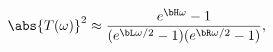 \begin{equation} \label{stringy-transmission}
\abs{T(\omega)}^2 \approx \frac{e^{\bH \omega} - 1}{(e^{\bL \omega/2} - 1)(e^{\bR \omega/2} - 1)},
\end{equation}

